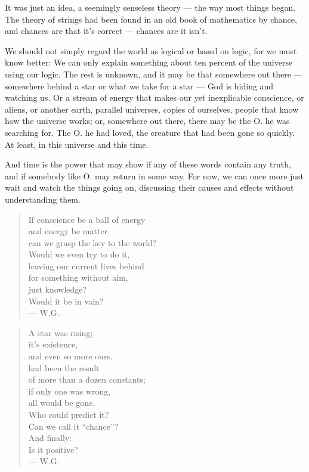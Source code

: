 It was just an idea, a seemingly senseless theory --- the way most things began. The theory of strings had been found in an old book of mathematics by chance, and chances are that it's correct --- chances are it isn't.

We should not simply regard the world as logical or based on logic, for we must know better: We can only explain something about ten percent of the universe using our logic. The rest is unknown, and it may be that somewhere out there --- somewhere behind a star or what we take for a star --- God is hiding and watching us. Or a stream of energy that makes our yet inexplicable conscience, or aliens, or another earth, parallel universes, copies of ourselves, people that know how the universe works; or, somewhere out there, there may be the O. he was searching for. The O. he had loved, the creature that had been gone so quickly.
At least, in this universe and this time.

And time is the power that may show if any of these words contain any truth, and if somebody like O. may return in some way. 
For now, we can once more just wait and watch the things going on, discussing their causes and effects without understanding them. 

\begin{verse}
If conscience be a ball of energy \\
and energy be matter \\
can we grasp the key to the world? \\
Would we even try to do it, \\
leaving our current lives behind \\
for something without aim, \\
just knowledge? \\
Would it be in vain? \\
--- W.G.
\end{verse}

\begin{verse}
A star was rising; \\
it's existence, \\
and even so more ours, \\
had been the result \\
of more than a dozen constants; \\
if only one was wrong, \\
all would be gone. \\
Who could predict it? \\
Can we call it \enquote{chance}? \\
And finally: \\
Is it positive? \\
--- W.G.
\end{verse}

